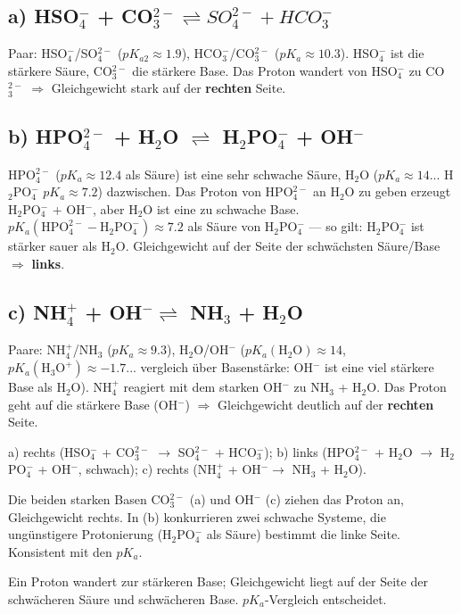
\subsection*{a) HSO$_4^-$ + CO$_3^{2-} \rightleftharpoons SO_4^{2-} + HCO_3^-$}
Paar: HSO$_4^-$/SO$_4^{2-}$ ($pK_{a2}\approx1.9$), HCO$_3^-$/CO$_3^{2-}$
($pK_a\approx10.3$). HSO$_4^-$ ist die stärkere Säure, CO$_3^{2-}$ die
stärkere Base. Das Proton wandert von HSO$_4^-$ zu CO$_3^{2-}$
$\Rightarrow$ Gleichgewicht stark auf der \textbf{rechten} Seite.

\subsection*{b) HPO$_4^{2-}$ + H$_2$O $\rightleftharpoons$ H$_2$PO$_4^-$ + OH$^-$}
HPO$_4^{2-}$ ($pK_a\approx12.4$ als Säure) ist eine sehr schwache Säure,
H$_2$O ($pK_a\approx14$... H$_2$PO$_4^-$ $pK_a\approx7.2$) dazwischen. Das
Proton von HPO$_4^{2-}$ an H$_2$O zu geben erzeugt H$_2$PO$_4^-$ + OH$^-$,
aber H$_2$O ist eine zu schwache Base. $pK_a(\mathrm{HPO_4^{2-}}-
\mathrm{H_2PO_4^-}) \approx 7.2$ als Säure von H$_2$PO$_4^-$ --- so gilt:
H$_2$PO$_4^-$ ist stärker sauer als H$_2$O. Gleichgewicht auf der Seite der
schwächsten Säure/Base $\Rightarrow$ \textbf{links}.

\subsection*{c) NH$_4^+$ + OH$^- \rightleftharpoons$ NH$_3$ + H$_2$O}
Paare: NH$_4^+$/NH$_3$ ($pK_a\approx9.3$), H$_2$O/OH$^-$ ($pK_a(\mathrm{H_2O})
\approx14$, $pK_a(\mathrm{H_3O^+})\approx-1.7$... vergleich über Basenstärke:
OH$^-$ ist eine viel stärkere Base als H$_2$O). NH$_4^+$ reagiert mit dem
starken OH$^-$ zu NH$_3$ + H$_2$O. Das Proton geht auf die stärkere Base
(OH$^-$) $\Rightarrow$ Gleichgewicht deutlich auf der
\textbf{rechten} Seite.

\begin{ergebnis}
a) rechts (HSO$_4^-$ + CO$_3^{2-}$ $\to$ SO$_4^{2-}$ + HCO$_3^-$);
b) links (HPO$_4^{2-}$ + H$_2$O $\to$ H$_2$PO$_4^-$ + OH$^-$, schwach);
c) rechts (NH$_4^+$ + OH$^- \to$ NH$_3$ + H$_2$O).
\end{ergebnis}

\begin{kontrolle}
Die beiden starken Basen CO$_3^{2-}$ (a) und OH$^-$ (c) ziehen das Proton
an, Gleichgewicht rechts. In (b) konkurrieren zwei schwache Systeme, die
ungünstigere Protonierung (H$_2$PO$_4^-$ als Säure) bestimmt die linke
Seite. Konsistent mit den $pK_a$.
\end{kontrolle}

\begin{merksatz}
Ein Proton wandert zur stärkeren Base; Gleichgewicht liegt auf der Seite
der schwächeren Säure und schwächeren Base. $pK_a$-Vergleich entscheidet.
\end{merksatz}
